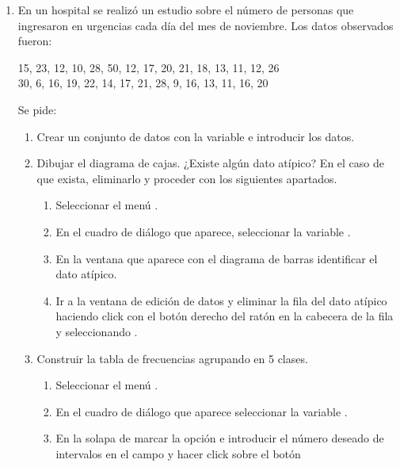 \begin{enumerate}[leftmargin=*]
\item En un hospital se realizó un estudio sobre el número de personas que ingresaron en urgencias cada día del mes de
noviembre. Los datos observados fueron:
\begin{center}
15, 23, 12, 10, 28, 50, 12, 17, 20, 21, 18, 13, 11, 12, 26 \\
30, 6, 16, 19, 22, 14, 17, 21, 28, 9, 16, 13, 11, 16, 20
\end{center}
Se pide:

\begin{enumerate}
\item  Crear un conjunto de datos con la variable  e introducir los datos.

\item  Dibujar el diagrama de cajas. ¿Existe algún dato atípico? En el caso de que exista, eliminarlo y proceder con los
siguientes apartados.
\begin{indicacion}{
\begin{enumerate}
\item Seleccionar el menú .
\item En el cuadro de diálogo que aparece, seleccionar la variable .
\item En la ventana que aparece con el diagrama de barras identificar el dato atípico.
\item Ir a la ventana de edición de datos y eliminar la fila del dato atípico haciendo click con el botón derecho del ratón en la cabecera de la fila y seleccionando .
\end{enumerate}}
\end{indicacion}

\item Construir la tabla de frecuencias agrupando en 5 clases.
\begin{indicacion}{
\begin{enumerate}
\item Seleccionar el menú .
\item En el cuadro de diálogo que aparece seleccionar la variable .
\item En la solapa de   marcar la opción  e introducir el número deseado de intervalos en el campo  y hacer click sobre el botón
\end{enumerate}}
\end{indicacion}


\end{enumerate}
\end{enumerate}

